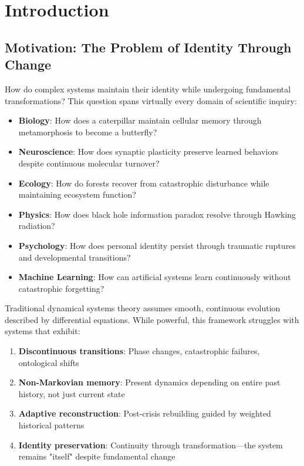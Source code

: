 \documentclass[11pt,a4paper]{article}
\theoremstyle{definition}
\theoremstyle{remark}
\begin{document}
\tableofcontents
\newpage

\section{Introduction}

\subsection{Motivation: The Problem of Identity Through Change}

How do complex systems maintain their identity while undergoing fundamental transformations? This question spans virtually every domain of scientific inquiry:

\begin{itemize}
\item \textbf{Biology}: How does a caterpillar maintain cellular memory through metamorphosis to become a butterfly?
\item \textbf{Neuroscience}: How does synaptic plasticity preserve learned behaviors despite continuous molecular turnover?
\item \textbf{Ecology}: How do forests recover from catastrophic disturbance while maintaining ecosystem function?
\item \textbf{Physics}: How does black hole information paradox resolve through Hawking radiation?
\item \textbf{Psychology}: How does personal identity persist through traumatic ruptures and developmental transitions?
\item \textbf{Machine Learning}: How can artificial systems learn continuously without catastrophic forgetting?
\end{itemize}

Traditional dynamical systems theory assumes smooth, continuous evolution described by differential equations. While powerful, this framework struggles with systems that exhibit:

\begin{enumerate}
\item \textbf{Discontinuous transitions}: Phase changes, catastrophic failures, ontological shifts
\item \textbf{Non-Markovian memory}: Present dynamics depending on entire past history, not just current state
\item \textbf{Adaptive reconstruction}: Post-crisis rebuilding guided by weighted historical patterns
\item \textbf{Identity preservation}: Continuity through transformation—the system remains "itself" despite fundamental change
\end{enumerate}
\end{document}
